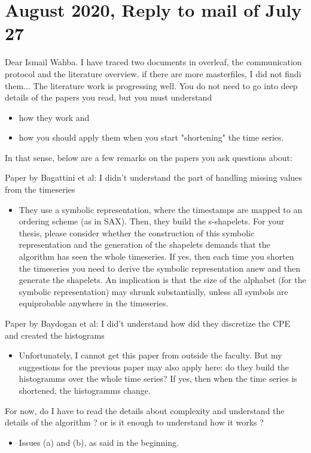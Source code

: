\documentclass{article}
\newcommand{\cmark}{\ding{51}}%
\newcommand{\done}{\rlap{$\square$}{\raisebox{2pt}{\large\hspace{1pt}\cmark}}%
\hspace{-2.5pt}}
\begin{document}
\section*{\texorpdfstring{}. August 2020, Reply to mail of July 27}
Dear Ismail Wahba.
I have traced two documents in overleaf, the communication protocol and the literature overview. if there are more masterfiles, I did not findi them...\newline
The literature work is progressing well.
You do not need to go into deep details of the papers you read, but you must understand
	\begin{itemize}
		\item how they work and
		\item how you should apply them when you start "shortening" the time series.
	\end{itemize}
In that sense, below are a few remarks on the papers you ask questions about:
	\begin{todolist}
		\item [\done] Paper by Bagattini et al: I didn't understand the part of handling missing values from the timeseries
			\begin{itemize}
				\item [\done] They use a symbolic representation, where the timestamps are mapped to an ordering scheme (as in SAX). Then, they build the s-shapelets. For your thesis, please consider whether the construction of this symbolic representation and the generation of the shapelets demands that the algorithm has seen the whole timeseries. If yes, then each time you shorten the timeseries you need to derive the symbolic representation anew and then generate the shapelets. An implication is that the size of the alphabet (for the symbolic representation) may shrunk substantially, unless all symbols are equiprobable anywhere in the timeseries.
			\end{itemize}
		\item Paper by Baydogan et al: I did't understand how did they discretize the CPE and created the histograms
			\begin{itemize}
				\item Unfortunately, I cannot get this paper from outside the faculty. But my suggestions for the previous paper may also apply here: do they build the histogramms over the whole time series? If yes, then when the time series is shortened, the histogramms change.
			\end{itemize}
		\item [\done] For now, do I have to read the details about complexity and understand the details of the algorithm ? or is it enough to understand how it works ?
			\begin{itemize}
				\item Issues (a) and (b), as said in the beginning.
			\end{itemize}
	\end{todolist}
\end{document}
